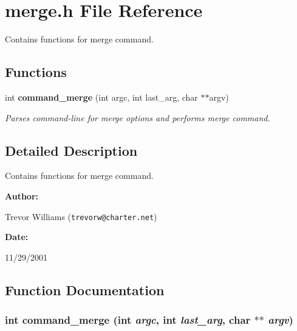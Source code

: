 \section{merge.h File Reference}
\label{merge_8h}
Contains functions for merge command. 


\subsection*{Functions}
\begin{CompactItemize}
\item 
int {\bf command\_\-merge} (int argc, int last\_\-arg, char $\ast$$\ast$argv)
\begin{CompactList}\small\item\em Parses command-line for merge options and performs merge command.\item\end{CompactList}\end{CompactItemize}


\subsection{Detailed Description}
Contains functions for merge command.



\begin{Desc}
\item[{\bf Author: }]\par
Trevor Williams ({\tt trevorw@charter.net}) \end{Desc}
\begin{Desc}
\item[{\bf Date: }]\par
11/29/2001

\end{Desc}


\subsection{Function Documentation}
\subsubsection{\setlength{\rightskip}{0pt plus 5cm}int command\_\-merge (int {\em argc}, int {\em last\_\-arg}, char $\ast$$\ast$ {\em argv})}\label{merge_8h_a0}


